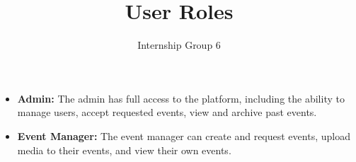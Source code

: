 \documentclass{article}
\title{User Roles}
\author{Internship Group 6}
\begin{document}
\maketitle
\begin{itemize}
    \item \textbf{Admin:} The admin has full access to the platform, including the ability to manage users, accept requested events, view and archive past events.
    \item \textbf{Event Manager:} The event manager can create and request events, upload media to their events, and view their own events.
\end{itemize}
\end{document}
